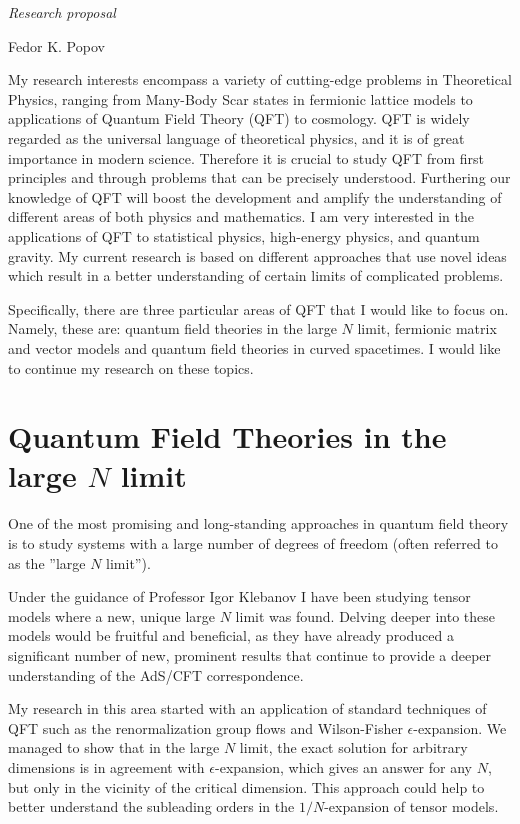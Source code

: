 \documentclass[11pt]{article}
\begin{document}
\begin{flushleft}
\it
\Large 
Research proposal

Fedor K. Popov 

\end{flushleft}



My research interests encompass a variety of cutting-edge problems in Theoretical Physics, ranging from Many-Body Scar states in fermionic lattice models to applications of Quantum Field Theory (QFT) to cosmology. QFT is widely regarded as the universal language of theoretical physics, and it is of great importance in modern science. Therefore it is crucial to study QFT from first principles and through problems that can be precisely understood. Furthering our knowledge of QFT will boost the development and amplify the understanding of different areas of both physics and mathematics. I am very interested
in the applications of QFT to statistical physics, high-energy physics, and quantum gravity. My current research is based on different approaches that use novel ideas which result in a better understanding of certain limits of complicated problems. %

Specifically, there are three particular areas of QFT that I would like to focus on. Namely, these are: quantum field theories in the large $N$ limit, fermionic matrix and vector models and quantum field theories in  curved spacetimes. I would like to continue my research on these topics. 

\section*{Quantum Field Theories in the large $N$ limit}
One of the most promising and long-standing approaches %
in quantum field theory is to study systems with a large number of degrees of freedom (often referred to as the ''large $N$ limit''). 

Under the guidance of Professor Igor Klebanov I have been studying tensor models where a new, unique large $N$ limit was found.
Delving deeper into these models would be fruitful and beneficial, as they have already produced a significant number of new, prominent results that continue to provide a deeper understanding of the AdS/CFT correspondence. 

My research in this area started with an application of standard techniques of QFT such as the renormalization group flows and Wilson-Fisher $\epsilon$-expansion.
We managed to show that in the large $N$ limit, the exact solution for arbitrary dimensions is in agreement with $\epsilon$-expansion, which gives an answer for any $N$, but only in the vicinity of the critical dimension. %
This approach could help to better understand the subleading orders in the $1/N$-expansion of tensor models.
\end{document}
